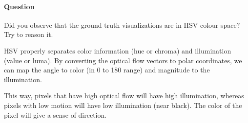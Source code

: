 \paragraph*{Question}
\begin{displayquote}
    Did you observe that the ground truth visualizations are in HSV colour space? Try to reason it.
\end{displayquote}

HSV properly separates color information (hue or chroma) and illumination (value or luma). By converting the optical flow vectors to polar coordinates, we can map the angle to color (in 0 to 180 range) and magnitude to the illumination.

This way, pixels that have high optical flow will have high illumination, whereas pixels with low motion will have low illumination (near black). The color of the pixel will give a sense of direction.
